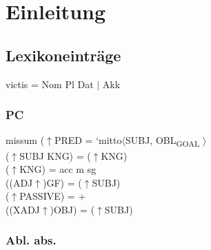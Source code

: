 \documentclass[12pt,a4paper]{article}
\begin{document}

\setcounter{page}{2}
\begingroup
\flushbottom
\tableofcontents
\thispagestyle{empty}
\pagebreak
\endgroup
\section{Einleitung}
\nocite{lucil1}
\nocite{lucil2} 
\nocite{original}
\nocite{seneca66} 
\nocite{hachmann1995} 
\nocite{bartsch}  
\nocite{philatinFLU} 
\nocite{becker1893sittlichen} 
\nocite{cancik} 
\nocite{inwood}
\nocite{edwards}
\nocite{motto} 
\nocite{becker1893sittlichen}
\nocite{philatinAUDIS}


\subsection{Lexikoneinträge}

victis = Nom Pl Dat $\mid$ Akk
\subsubsection{PC}

missum ($\uparrow$PRED = `mitto$\langle$SUBJ, OBL\textsubscript{GOAL} $\rangle$\\
($\uparrow$SUBJ KNG) = ($\uparrow$KNG)\\
($\uparrow$KNG) = acc m sg \\
((ADJ$\uparrow$)GF) = ($\uparrow$SUBJ) \\
($\uparrow$PASSIVE) = + \\
((XADJ$\uparrow$)OBJ) = ($\uparrow$SUBJ) \\

\subsubsection{Abl. abs.}
\end{document}

